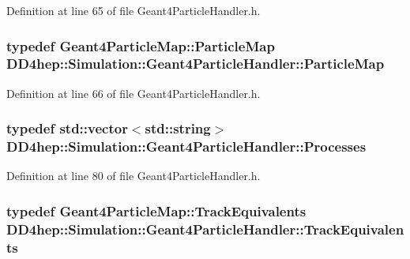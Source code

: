 Definition at line 65 of file Geant4ParticleHandler.h.\hypertarget{class_d_d4hep_1_1_simulation_1_1_geant4_particle_handler_a79cf5fe4ceb492dff4d3458306a08973}{
\subsubsection[{ParticleMap}]{\setlength{\rightskip}{0pt plus 5cm}typedef {\bf Geant4ParticleMap::ParticleMap} {\bf DD4hep::Simulation::Geant4ParticleHandler::ParticleMap}}}
\label{class_d_d4hep_1_1_simulation_1_1_geant4_particle_handler_a79cf5fe4ceb492dff4d3458306a08973}


Definition at line 66 of file Geant4ParticleHandler.h.\hypertarget{class_d_d4hep_1_1_simulation_1_1_geant4_particle_handler_a80c1482fd25ec687f429854033ac3f79}{
\subsubsection[{Processes}]{\setlength{\rightskip}{0pt plus 5cm}typedef std::vector$<$std::string$>$ {\bf DD4hep::Simulation::Geant4ParticleHandler::Processes}}}
\label{class_d_d4hep_1_1_simulation_1_1_geant4_particle_handler_a80c1482fd25ec687f429854033ac3f79}


Definition at line 80 of file Geant4ParticleHandler.h.\hypertarget{class_d_d4hep_1_1_simulation_1_1_geant4_particle_handler_a6163ec58bca837bb4544fd6e2f4bc05a}{
\subsubsection[{TrackEquivalents}]{\setlength{\rightskip}{0pt plus 5cm}typedef {\bf Geant4ParticleMap::TrackEquivalents} {\bf DD4hep::Simulation::Geant4ParticleHandler::TrackEquivalents}}}
\label{class_d_d4hep_1_1_simulation_1_1_geant4_particle_handler_a6163ec58bca837bb4544fd6e2f4bc05a}


